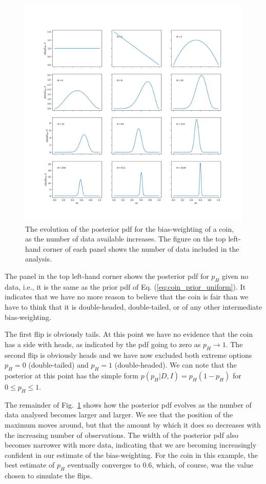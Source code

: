 \documentclass[%
oneside,                 %
final,                   %
10pt]{article}
\begin{document}
\begin{figure}[!ht]  %
  \centerline{\includegraphics[width=0.95\linewidth]{fig/coinflipping_fig_1.png}}
  \caption{
  The evolution of the posterior pdf for the bias-weighting of a coin, as the number of data available increases. The figure on the top left-hand corner of each panel shows the number of data included in the analysis. \label{fig:coinflipping}
  }
\end{figure}


The panel in the top left-hand corner shows the posterior pdf for $p_H$ given no data, i.e., it is the same as the prior pdf of Eq. (\ref{eq:coin_prior_uniform}). It indicates that we have no more reason to believe that the coin is fair than we have to think that it is double-headed, double-tailed, or of any other intermediate bias-weighting.

The first flip is obviously tails. At this point we have no evidence that the coin has a side with heads, as indicated by the pdf going to zero as $p_H \to 1$. The second flip is obviously heads and we have now excluded both extreme options $p_H=0$ (double-tailed) and $p_H=1$ (double-headed). We can note that the posterior at this point has the simple form $p(p_H|D,I) = p_H(1-p_H)$ for $0 \le p_H \le 1$.

The remainder of Fig.~\ref{fig:coinflipping} shows how the posterior pdf evolves as the number of data analysed becomes larger and larger. We see that the position of the maximum moves around, but that the amount by which it does so decreases with the increasing number of observations. The width of the posterior pdf also becomes narrower with more data, indicating that we are becoming increasingly confident in our estimate of the bias-weighting. For the coin in this example, the best estimate of $p_H$ eventually converges to 0.6, which, of course, was the value chosen to simulate the flips.
\end{document}
